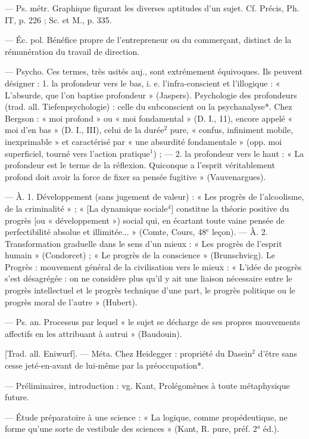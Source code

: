 \begin{itemize}[leftmargin=1cm, label=, itemsep=1pt]
 — Ps. métr. Graphique figurant les diverses aptitudes d’un sujet. Cf. Précis, Ph. IT,
p. 226 ; Sc. et M., p. 335.

 — Éc. pol. Bénéfice propre de
l'entrepreneur ou du commerçant,
distinct de la rémunération du travail de direction.

 — Psycho. Ces
termes, très usités auj., sont extrémement équivoques. Ils peuvent
désigner : 1. la profondeur vers le
bas, i. e. l’infra-conscient et l'illogique : « L’absurde, que l’on baptise
profondeur » (Jaspers). Psychologie
des profondeurs (trad. all. Tiefenpsychologie) : celle du subconscient
ou la psychanalyse*. Chez Bergson :
« moi profond » ou « moi fondamental » (D. I., 11), encore appelé « moi
d’en bas » (D. I., III), celui de la
durée$^2$ pure, « confus, infiniment
mobile, inexprimable » et caractérisé par « une absurdité fondamentale » (opp. moi superficiel, tourné
vers l’action pratique$^1$) ; — 2. la profondeur vers le haut : « La profondeur est le terme de la réflexion.
Quiconque a l'esprit véritablement
profond doit avoir la force de fixer
sa pensée fugitive » (Vauvenargues).

 — À. 1. Développement (sans
jugement de valeur) : « Les progrès
de l'alcoolisme, de la criminalité » ;
« [La dynamique sociale$^4$] constitue
la théorie positive du progrès [ou
« développement ») social qui, en
écartant toute vaine pensée de perfectibilité absolue et illimitée... »
(Comte, Cours, 48$^\text{e}$ leçon). — À. 2.
Transformation graduelle dans le
sens d'un mieux : « Les progrès de
l'esprit humain » (Condorcet) ; « Le
progrès de la conscience » (Brunschvicg). Le Progrès : mouvement général de la civilisation vers le mieux :
« L'idée de progrès s’est désagrégée :
on ne considère plus qu'il y ait une
liaison nécessaire entre le progrès
intellectuel et le progrès technique
d'une part, le progrès politique ou
le progrès moral de l’autre » (Hubert).

 — Ps. an. Processus par
lequel « le sujet se décharge de ses
propres mouvements affectifs en les
attribuant à autrui » (Baudouin).

 [Trad. all. Eniwurf]. — Méta.
Chez Heidegger : propriété du Dasein$^2$ d’être sans cesse jeté-en-avant
de lui-même par la préoccupation*.

 — Préliminaires, introduction : vg. Kant, Prolégomènes
à toute métaphysique future.

 — Étude préparatoire
à une science : « La logique, comme
propédeutique, ne forme qu'une
sorte de vestibule des sciences »
(Kant, R. pure, préf. 2° éd.).


\end{itemize}

